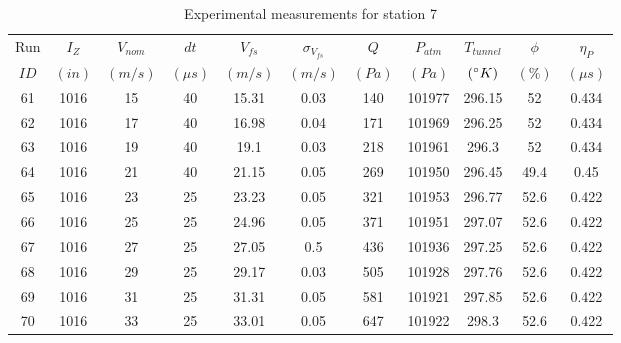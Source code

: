 \renewcommand\baselinestretch{1.3}\selectfont
\begin{table}[H]
\begin{center}
\begin{tabular}{|ccccccccccc|}
	\hline
	Run & $I_Z$ & $V_{nom}$ & $dt$ & $V_{fs}$ & $\sigma_{V_{fs}}$ & $Q$ & $P_{atm}$ & $T_{tunnel}$ & $\phi$ & $\eta_P$\\
	$ID$ & $(in)$ & $(m/s)$ & $(\mu s)$ & $(m/s)$ & $(m/s)$ & $(Pa)$ & $(Pa)$ & $(\degree K)$ & $(\%)$ & $(\mu s)$\\
	\hline
	61 & 1016 & 15 & 40 & 15.31 & 0.03 & 140 & 101977 & 296.15 & 52 & 0.434\\
	62 & 1016 & 17 & 40 & 16.98 & 0.04 & 171 & 101969 & 296.25 & 52 & 0.434\\
	63 & 1016 & 19 & 40 & 19.1 & 0.03 & 218 & 101961 & 296.3 & 52 & 0.434\\
	64 & 1016 & 21 & 40 & 21.15 & 0.05 & 269 & 101950 & 296.45 & 49.4 & 0.45\\
	65 & 1016 & 23 & 25 & 23.23 & 0.05 & 321 & 101953 & 296.77 & 52.6 & 0.422\\
	66 & 1016 & 25 & 25 & 24.96 & 0.05 & 371 & 101951 & 297.07 & 52.6 & 0.422\\
	67 & 1016 & 27 & 25 & 27.05 & 0.5 & 436 & 101936 & 297.25 & 52.6 & 0.422\\
	68 & 1016 & 29 & 25 & 29.17 & 0.03 & 505 & 101928 & 297.76 & 52.6 & 0.422\\
	69 & 1016 & 31 & 25 & 31.31 & 0.05 & 581 & 101921 & 297.85 & 52.6 & 0.422\\
	70 & 1016 & 33 & 25 & 33.01 & 0.05 & 647 & 101922 & 298.3 & 52.6 & 0.422\\
	\hline
\end{tabular}
\caption{Experimental measurements for station 7}
\label{table:station_7_measurements}
\end{center}
\end{table}
\renewcommand\baselinestretch{2}\selectfont
